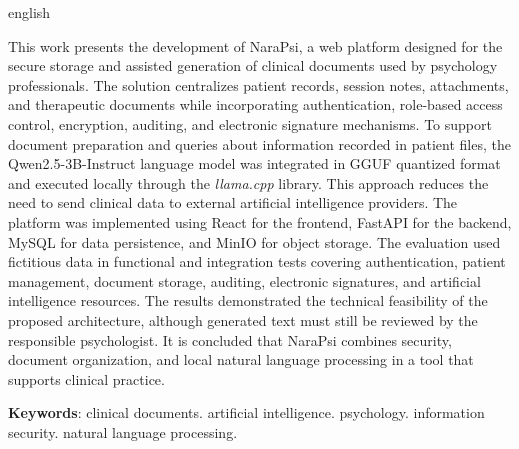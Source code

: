 \begin{resumo}[Abstract]	
\begin{otherlanguage*}{english}
\noindent 

This work presents the development of NaraPsi, a web platform designed for the secure storage and assisted generation of clinical documents used by psychology professionals. The solution centralizes patient records, session notes, attachments, and therapeutic documents while incorporating authentication, role-based access control, encryption, auditing, and electronic signature mechanisms. To support document preparation and queries about information recorded in patient files, the Qwen2.5-3B-Instruct language model was integrated in GGUF quantized format and executed locally through the \textit{llama.cpp} library. This approach reduces the need to send clinical data to external artificial intelligence providers. The platform was implemented using React for the frontend, FastAPI for the backend, MySQL for data persistence, and MinIO for object storage. The evaluation used fictitious data in functional and integration tests covering authentication, patient management, document storage, auditing, electronic signatures, and artificial intelligence resources. The results demonstrated the technical feasibility of the proposed architecture, although generated text must still be reviewed by the responsible psychologist. It is concluded that NaraPsi combines security, document organization, and local natural language processing in a tool that supports clinical practice.

\vspace{0.2cm}
\textbf{Keywords}: clinical documents. artificial intelligence. psychology. information security. natural language processing.
\end{otherlanguage*}
\end{resumo}
